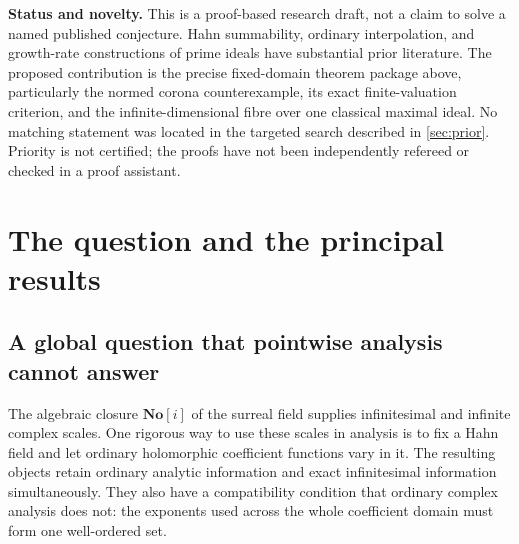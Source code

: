 \documentclass[11pt,letterpaper]{article}
\numberwithin{equation}{section}
\theoremstyle{definition}
\theoremstyle{remark}
\newcommand{\No}{\mathbf{No}}
\newcommand{\OO}{\mathcal O}
\newcommand{\HH}{\mathcal H}
\begin{document}
\begin{titlepage}
\begin{minipage}{0.96\textwidth}
\begin{abstract}
We also construct a continuum-sized strictly ordered family of prime
ideals of $\HH$, all contracting to a single free maximal ideal of
$\OO(D)$. Thus one spectral fibre is an infinite-dimensional domain; the displayed
primes have the same norm closure and lie below an explicit
coefficient-reduction maximal ideal. They are contained in no geometric
evaluation maximal ideal, whereas
localization at \emph{every} actual surcomplex evaluation point is a
discrete valuation ring with completion $K[[X]]$. The results separate
geometric regularity from the much larger global algebraic spectrum and
correct a fixed-domain structure assertion in the supplied repository.
The explicit corona example and prime-fibre construction have real forms
inside surreal-valued analysis.
\end{abstract}
\end{minipage}
\vfill
\begin{minipage}{0.96\textwidth}\small
\textbf{Status and novelty.} This is a proof-based research draft, not a
claim to solve a named published conjecture. Hahn summability, ordinary
interpolation, and growth-rate constructions of prime ideals have
substantial prior literature. The proposed contribution is the precise
fixed-domain theorem package above, particularly the normed corona
counterexample, its exact finite-valuation criterion, and the
infinite-dimensional fibre over one classical maximal ideal. No matching
statement was located in the targeted search described in
\cref{sec:prior}. Priority is not certified; the proofs have not been
independently refereed or checked in a proof assistant.
\end{minipage}
\end{titlepage}

\tableofcontents
\clearpage
{}

\section{The question and the principal results}\label{sec:introduction}

\subsection{A global question that pointwise analysis cannot answer}
The algebraic closure $\No[i]$ of the surreal field supplies infinitesimal
and infinite complex scales. One rigorous way to use these scales in
analysis is to fix a Hahn field and let ordinary holomorphic coefficient
functions vary in it. The resulting objects retain ordinary analytic
information and exact infinitesimal information simultaneously. They also
have a compatibility condition that ordinary complex analysis does not:
the exponents used across the whole coefficient domain must form one
well-ordered set.
\end{document}
